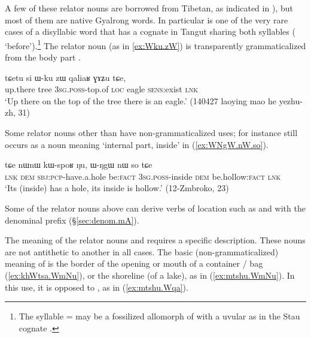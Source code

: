 A few of these relator nouns are borrowed from Tibetan, as indicated in ), but most of them are native Gyalrong words. In particular  is one of the very rare cases of a disyllabic word that has a cognate in Tangut sharing both syllables ( `before').\footnote{The syllable  =  may be a fossilized allomorph of  with a uvular as in the Stau cognate .} The relator noun  (as in \ref{ex:Wku.zW}) is transparently grammaticalized from the body part .

\begin{exe}
\ex \label{ex:Wku.zW}
 \gll tɕetu si ɯ-ku zɯ qaliaʁ ɣɤʑu tɕe, \\
 up.there tree \textsc{3sg}.\textsc{poss}-top.of \textsc{loc} eagle \textsc{sens}:exist \textsc{lnk} \\
 \glt `Up there on the top of the tree there is an eagle.' (140427 laoying mao he yezhu-zh, 31)
\end{exe}

Some relator nouns other than  have non-grammaticalized uses; for instance  still occurs as a noun meaning  `internal part, inside' in (\ref{ex:WNgW.nW.so}).

\begin{exe}
\ex \label{ex:WNgW.nW.so}
 \gll tɕe nɯnɯ kɯ-spoʁ ŋu, ɯ-ŋgɯ nɯ so tɕe  \\
 \textsc{lnk} \textsc{dem} \textsc{sbj}:\textsc{pcp}-have.a.hole be:\textsc{fact} \textsc{3sg}.\textsc{poss}-inside \textsc{dem} be.hollow:\textsc{fact} \textsc{lnk} \\
 \glt `Its (inside) has a hole, its inside is hollow.' (12-Zmbroko, 23)
\end{exe}

Some of the relator nouns above can derive verbs of location such as  and  with the denominal prefix  (§\ref{sec:denom.mA}).

The meaning of the relator nouns  and  requires a specific description. These nouns are not antithetic to another in all cases. The basic (non-grammaticalized) meaning of    is the border of the opening or mouth of a container / bag (\ref{ex:khWtsa.WmNu}), or the shoreline (of a lake), as in (\ref{ex:mtshu.WmNu}). In this use, it is opposed to , as in (\ref{ex:mtshu.Wqa}).


